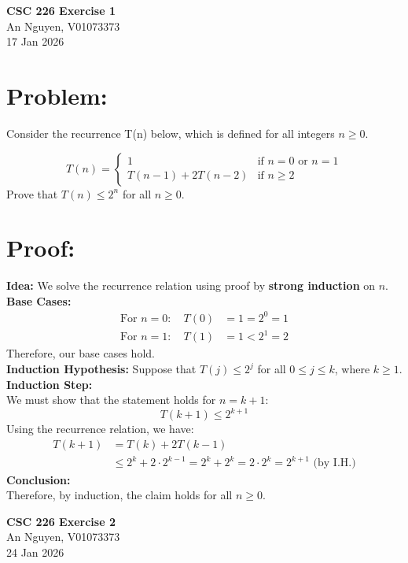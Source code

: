 \documentclass[12pt, b5paper]{article}
\begin{document}
\begin{center}
{\bf CSC 226
Exercise 1}\\
An Nguyen, V01073373\\
17 Jan 2026
\end{center}

\section*{Problem:}
Consider the recurrence T(n) below, which is defined for all integers $n \geq 0$.

$$
T(n) = 
\begin{cases}
    1 & \text{if } n = 0 \text{ or } n = 1 \\
    T(n-1) + 2T(n-2) & \text{if } n \geq 2
\end{cases}
$$
Prove that $T(n) \leq 2^n$ for all $n \geq 0$.

\section*{Proof:}

\textbf{Idea: }
We solve the recurrence relation using proof by \textbf{strong induction} on $n$. \\
\newline
\textbf{Base Cases: }
\begin{align*}
\text{For } n = 0: \quad T(0) &= 1 = 2^0 = 1 \\
\text{For } n = 1: \quad T(1) &= 1 < 2^1 = 2
\end{align*}
Therefore, our base cases hold. \\
\newline
\textbf{Induction Hypothesis: }
Suppose that $T(j) \leq 2^j$ for all $0 \leq j \leq k$, where $k \geq 1$.\\
\newline
\textbf{Induction Step: } \\
We must show that the statement holds for $n = k + 1$: 
$$T(k+1) \leq 2^{k+1}$$
Using the recurrence relation, we have:
\begin{align*}
T(k+1) &= T(k) + 2T(k-1) \\
&\leq 2^k + 2 \cdot 2^{k-1}
= 2^k + 2^k = 2 \cdot 2^k = 2^{k+1}  \text{ (by I.H.)} 
\end{align*}
\textbf{Conclusion: } \\
Therefore, by induction, the claim holds for all $n \geq 0$.

\newpage
\begin{center}
{\bf CSC 226
Exercise 2}\\
An Nguyen, V01073373\\
24 Jan 2026
\end{center}
\end{document}
